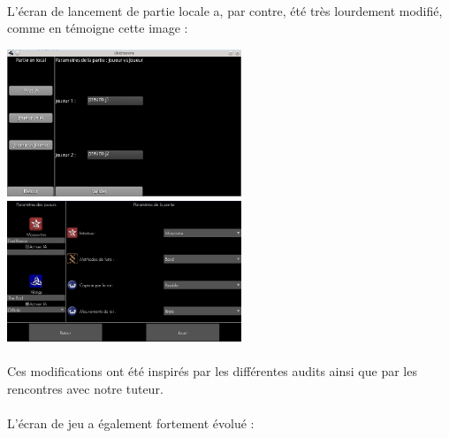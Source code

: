 \documentclass[11pt]{article} %
\begin{document}
\begin{sffamily}
\paragraph{}
L'écran de lancement de partie locale a, par contre, été très lourdement modifié, comme en témoigne cette image :

\begin{center}
\includegraphics[width=7cm]{snapshot4.png}
\includegraphics[width=7cm]{validDoc2.jpg}
\end{center}
\paragraph{}
Ces modifications ont été inspirés par les différentes audits ainsi que par les rencontres avec notre tuteur.
\paragraph{}
L'écran de jeu a également fortement évolué :


\end{sffamily}
\end{document}
